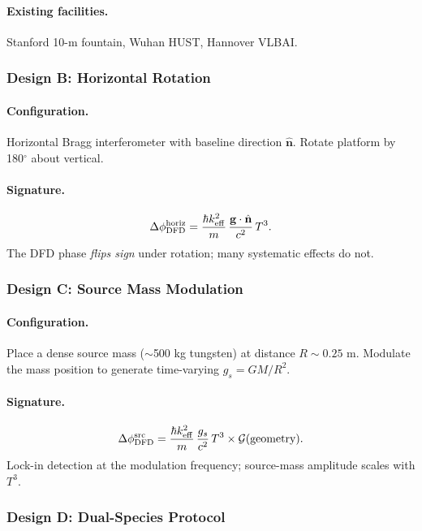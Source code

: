 \paragraph{Existing facilities.}
Stanford 10-m fountain, Wuhan HUST, Hannover VLBAI.

\subsubsection{Design B: Horizontal Rotation}

\paragraph{Configuration.}
Horizontal Bragg interferometer with baseline direction $\hat{\mathbf{n}}$. Rotate platform by 180$^\circ$ about vertical.

\paragraph{Signature.}
\begin{equation}
\Delta\phi_{\rm DFD}^{\rm horiz} = \frac{\hbar k_{\rm eff}^2}{m}\,\frac{\mathbf{g}\cdot\hat{\mathbf{n}}}{c^2}\,T^3.
\end{equation}
The DFD phase \textit{flips sign} under rotation; many systematic effects do not.

\subsubsection{Design C: Source Mass Modulation}

\paragraph{Configuration.}
Place a dense source mass ($\sim$500 kg tungsten) at distance $R \sim 0.25$ m. Modulate the mass position to generate time-varying $g_s = GM/R^2$.

\paragraph{Signature.}
\begin{equation}
\Delta\phi_{\rm DFD}^{\rm src} = \frac{\hbar k_{\rm eff}^2}{m}\,\frac{g_s}{c^2}\,T^3 \times \mathcal{G}(\text{geometry}).
\end{equation}
Lock-in detection at the modulation frequency; source-mass amplitude scales with $T^3$.

\subsubsection{Design D: Dual-Species Protocol}

